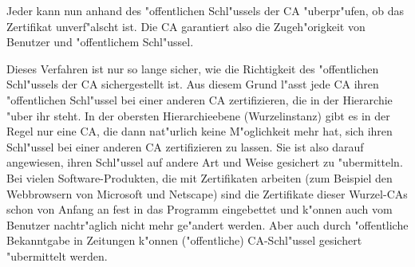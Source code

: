 Jeder kann nun anhand des "offentlichen Schl"ussels der CA "uberpr"ufen, ob das Zertifikat unverf"alscht ist. Die
CA garantiert also die Zugeh"origkeit von Benutzer und "offentlichem Schl"ussel.

Dieses Verfahren ist nur so lange sicher, wie die Richtigkeit des "offentlichen Schl"ussels der CA
sichergestellt ist. Aus diesem Grund l"asst jede CA ihren "offentlichen Schl"ussel bei einer anderen CA
zertifizieren, die in der Hierarchie "uber ihr steht. In der obersten
Hierarchieebene (Wurzelinstanz) gibt es in der Regel
nur eine CA, die dann nat"urlich keine M"oglichkeit mehr hat, sich ihren Schl"ussel bei einer anderen CA
zertifizieren zu lassen. Sie ist also darauf angewiesen, ihren Schl"ussel auf andere Art und Weise gesichert
zu "ubermitteln. Bei vielen Software-Produkten, die mit Zertifikaten arbeiten (zum Beispiel den Webbrowsern
von Microsoft und Netscape) sind die Zertifikate dieser Wurzel-CAs schon von Anfang an fest in das Programm
eingebettet und k"onnen auch vom Benutzer nachtr"aglich nicht mehr ge"andert werden. Aber auch durch
"offentliche Bekanntgabe in Zeitungen k"onnen ("offentliche) CA-Schl"ussel
gesichert "ubermittelt werden.


